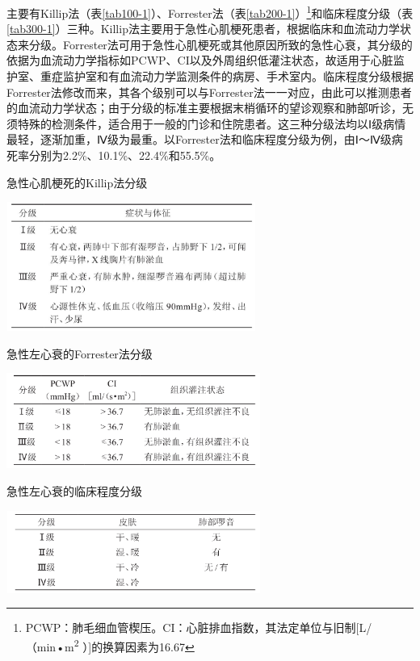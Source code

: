 主要有Killip法（表\ref{tab100-1}）、Forrester法（表\ref{tab200-1}）\footnote{PCWP：肺毛细血管楔压。CI：心脏排血指数，其法定单位与旧制{[}L/（min•m\textsuperscript{2}
）{]}的换算因素为16.67}和临床程度分级（表\ref{tab300-1}）三种。Killip法主要用于急性心肌梗死患者，根据临床和血流动力学状态来分级。Forrester法可用于急性心肌梗死或其他原因所致的急性心衰，其分级的依据为血流动力学指标如PCWP、CI以及外周组织低灌注状态，故适用于心脏监护室、重症监护室和有血流动力学监测条件的病房、手术室内。临床程度分级根据Forrester法修改而来，其各个级别可以与Forrester法一一对应，由此可以推测患者的血流动力学状态；由于分级的标准主要根据末梢循环的望诊观察和肺部听诊，无须特殊的检测条件，适合用于一般的门诊和住院患者。这三种分级法均以Ⅰ级病情最轻，逐渐加重，Ⅳ级为最重。以Forrester法和临床程度分级为例，由Ⅰ～Ⅳ级病死率分别为2.2\%、10.1\%、22.4\%和55.5\%。

\begin{table}[htbp]
\centering
\caption{急性心肌梗死的Killip法分级}
\label{tab100-1}
\includegraphics[width=3.21875in,height=1.66667in]{./images/Image00106.jpg}
\end{table}

\begin{table}[htbp]
\centering
\caption{急性左心衰的Forrester法分级}
\label{tab200-1}
\includegraphics[width=3.27083in,height=1.22917in]{./images/Image00107.jpg}
\end{table}

\begin{table}[htbp]
\centering
\caption{急性左心衰的临床程度分级}
\label{tab300-1}
\includegraphics[width=3.28125in,height=1.0625in]{./images/Image00108.jpg}
\end{table}

